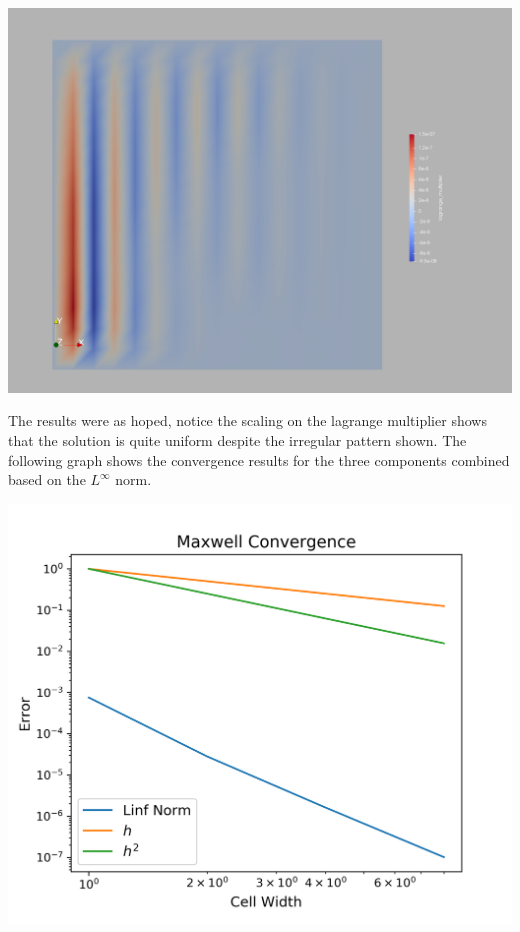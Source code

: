 \documentclass{article}
\begin{document}
                \begin{center}
                \includegraphics[scale=.2]{lagrange.png}
                \end{center}

                The results were as hoped, notice the scaling on the lagrange multiplier shows that the solution is quite uniform despite the irregular pattern shown. The following graph shows the convergence results for the three components combined based on the $L^\infty$ norm.

                \begin{center}
                \includegraphics[scale=.6]{presentation/mx_conv.png}
                \end{center}
\end{document}
